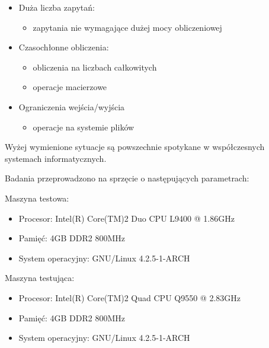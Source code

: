 \documentclass[12pt,twoside]{article}
\providecommand{\tightlist}{  \setlength{\itemsep}{0pt}\setlength{\parskip}{0pt}}
\begin{document}
\begin{itemize}
\tightlist
\item
  Duża liczba zapytań:

  \begin{itemize}
  \tightlist
  \item
    zapytania nie wymagające dużej mocy obliczeniowej
  \end{itemize}
\item
  Czasochłonne obliczenia:

  \begin{itemize}
  \tightlist
  \item
    obliczenia na liczbach całkowitych
  \item
    operacje macierzowe
  \end{itemize}
\item
  Ograniczenia wejścia/wyjścia

  \begin{itemize}
  \tightlist
  \item
    operacje na systemie plików
  \end{itemize}
\end{itemize}

Wyżej wymienione sytuacje są powszechnie spotykane w współczesnych
systemach informatycznych.

Badania przeprowadzono na sprzęcie o następujących parametrach:

Maszyna testowa:

\begin{itemize}
\tightlist
\item
  Procesor: Intel(R) Core(TM)2 Duo CPU L9400 @ 1.86GHz
\item
  Pamięć: 4GB DDR2 800MHz
\item
  System operacyjny: GNU/Linux 4.2.5-1-ARCH
\end{itemize}

Maszyna testująca:

\begin{itemize}
\tightlist
\item
  Procesor: Intel(R) Core(TM)2 Quad CPU Q9550 @ 2.83GHz
\item
  Pamięć: 4GB DDR2 800MHz
\item
  System operacyjny: GNU/Linux 4.2.5-1-ARCH
\end{itemize}
\end{document}
